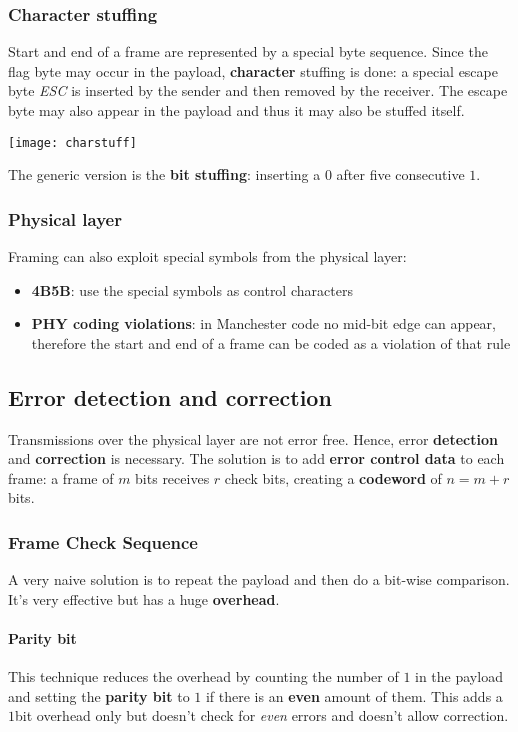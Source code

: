 \subsubsection{Character stuffing}
Start and end of a frame are represented by a special byte sequence. Since the flag byte may occur in the payload, \textbf{character} stuffing is done: a special escape byte \textit{ESC} is inserted by the sender and then removed by the receiver. The escape byte may also appear in the payload and thus it may also be stuffed itself.
\begin{center}
	\texttt{[image: charstuff]}
\end{center}
The generic version is the \textbf{bit stuffing}: inserting a $0$ after five consecutive $1$.

\subsubsection{Physical layer}
Framing can also exploit special symbols from the physical layer:
\begin{itemize}
	\item \textbf{4B5B}: use the special symbols as control characters
	\item \textbf{PHY coding violations}: in Manchester code no mid-bit edge can appear, therefore the start and end of a frame can be coded as a violation of that rule
\end{itemize}

\subsection{Error detection and correction}
Transmissions over the physical layer are not error free. Hence, error \textbf{detection} and \textbf{correction }is necessary. The solution is to add \textbf{error control data} to each frame: a frame of $m$ bits receives $r$ check bits, creating a \textbf{codeword} of $n=m+r$ bits.

\subsubsection{Frame Check Sequence}
A very naive solution is to repeat the payload and then do a bit-wise comparison. It's very effective but has a huge \textbf{overhead}.

\paragraph{Parity bit}
This technique reduces the overhead by counting the number of $1$ in the payload and setting the \textbf{parity bit} to $1$ if there is an \textbf{even} amount of them. This adds a $1$bit overhead only but doesn't check for \textit{even} errors and doesn't allow correction.

